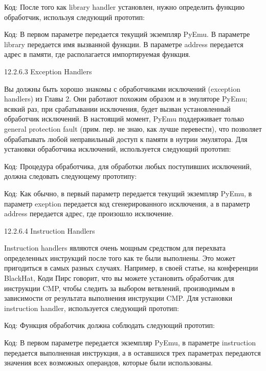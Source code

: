 \documentclass[12pt, a4paper, oneside]{book}
\begin{document}
Код:
После того как library handler установлен, нужно определить функцию обработчик, используя следующий прототип:

Код:
В первом параметре передается текущий экземпляр PyEmu. В параметре library передается имя вызванной функции. В параметре address передается адрес в памяти, где располагается импортируемая функция. 

12.2.6.3 Exception Handlers

Вы должны быть хорошо знакомы с обработчиками исключений (exception handlers) из Главы 2. Они работают похожим образом и в эмуляторе PyEmu; всякий раз, при срабатывании исключения, будет вызван установленный обработчик исключений. В настоящий момент, PyEmu поддерживает только general protection fault (прим. пер. не знаю, как лучше перевести), что позволяет обрабатывать любой неправильный доступ к памяти в нутрии эмулятора. Для установки обработчика исключений, используется следующий прототип: 

Код:
Процедура обработчика, для обработки любых поступивших исключений, должна следовать следующему прототипу:

Код:
Как обычно, в первый параметр передается текущий экземпляр PyEmu, в параметр exeption передается код сгенерированного исключения, а в параметр address передается адрес, где произошло исключение.

12.2.6.4 Instruction Handlers

Instruction handlers являются очень мощным средством для перехвата определенных инструкций после того как те были выполнены. Это может пригодиться в самых разных случаях. Например, в своей статье, на конференции BlackHat, Коди Пирс говорит, что вы можете установить обработчик для инструкции CMP, чтобы следить за выбором ветвлений, производимым в зависимости от результата выполнения инструкции CMP. Для установки instruction handler, используется следующий прототип:

Код:
Функция обработчик должна соблюдать следующий прототип:

Код:
В первом параметре передается экземпляр PyEmu, в параметре instruction передается выполненная инструкция, а в оставшихся трех параметрах передаются значения всех возможных операндов, которые были использованы. 
\end{document}
